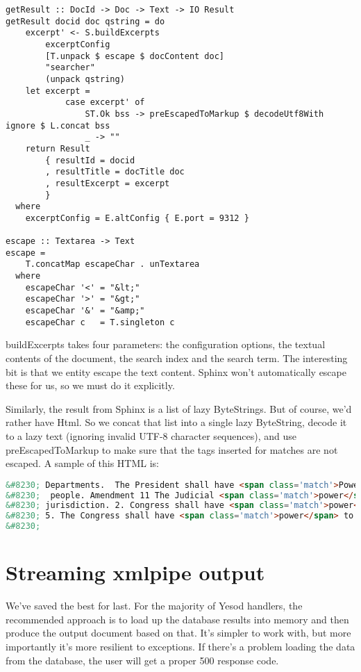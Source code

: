 \begin{lstlisting}
getResult :: DocId -> Doc -> Text -> IO Result
getResult docid doc qstring = do
    excerpt' <- S.buildExcerpts
        excerptConfig
        [T.unpack $ escape $ docContent doc]
        "searcher"
        (unpack qstring)
    let excerpt =
            case excerpt' of
                ST.Ok bss -> preEscapedToMarkup $ decodeUtf8With ignore $ L.concat bss
                _ -> ""
    return Result
        { resultId = docid
        , resultTitle = docTitle doc
        , resultExcerpt = excerpt
        }
  where
    excerptConfig = E.altConfig { E.port = 9312 }

escape :: Textarea -> Text
escape =
    T.concatMap escapeChar . unTextarea
  where
    escapeChar '<' = "&lt;"
    escapeChar '>' = "&gt;"
    escapeChar '&' = "&amp;"
    escapeChar c   = T.singleton c
\end{lstlisting}

buildExcerpts takes four parameters: the configuration options, the textual contents of the document, the search index and the search term. The interesting bit is that we entity escape the text content. Sphinx won't automatically escape these for us, so we must do it explicitly.

Similarly, the result from Sphinx is a list of lazy ByteStrings. But of course, we'd rather have Html. So we concat that list into a single lazy ByteString, decode it to a lazy text (ignoring invalid UTF-8 character sequences), and use preEscapedToMarkup to make sure that the tags inserted for matches are not escaped. A sample of this HTML is:

\begin{lstlisting}[language=HTML]
&#8230; Departments.  The President shall have <span class='match'>Power</span> to fill up all Vacancies
&#8230;  people. Amendment 11 The Judicial <span class='match'>power</span> of the United States shall
&#8230; jurisdiction. 2. Congress shall have <span class='match'>power</span> to enforce this article by
&#8230; 5. The Congress shall have <span class='match'>power</span> to enforce, by appropriate legislation
&#8230;
\end{lstlisting}


\section{Streaming xmlpipe output} %

We've saved the best for last. For the majority of Yesod handlers, the recommended approach is to load up the database results into memory and then produce the output document based on that. It's simpler to work with, but more importantly it's more resilient to exceptions. If there's a problem loading the data from the database, the user will get a proper 500 response code.

